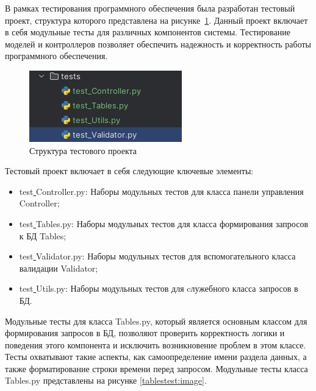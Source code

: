 В рамках тестирования программного обеспечения была разработан тестовый проект, структура которого представлена на рисунке~\ref{fig:test1}. Данный проект включает в себя модульные тесты для различных компонентов системы.
Тестирование моделей и контроллеров позволяет обеспечить надежность и корректность работы программного обеспечения. 
\begin{figure}[H]
	\centering
	\includegraphics[width=1\linewidth]{images/test1}
	\caption{Структура тестового проекта}
	\label{fig:test1}
\end{figure}
Тестовый проект включает в себя следующие ключевые элементы:
\begin{itemize}
	\item test\underline{ }Controller.py: Наборы модульных тестов для класса панели управления Controller;
	\item test\underline{ }Tables.py: Наборы модульных тестов для класса формирования запросов к БД Tables;
	\item test\underline{ }Validator.py: Наборы модульных тестов для вспомогательного класса валидации Validator;
	\item test\underline{ }Utils.py: Наборы модульных тестов для cлужебного класса запросов в БД.
\end{itemize}
Модульные тесты для класса Tables.py, который является основным классом для формирования запросов в БД, позволяют проверить корректность
логики и поведения этого компонента и исключить возникновение проблем в этом классе. Тесты охватывают такие аспекты, как самоопределение имени раздела данных, а также форматирование строки времени перед запросом.
Модульные тесты класса Tables.py представлены на рисунке \ref{tablestest:image}.

